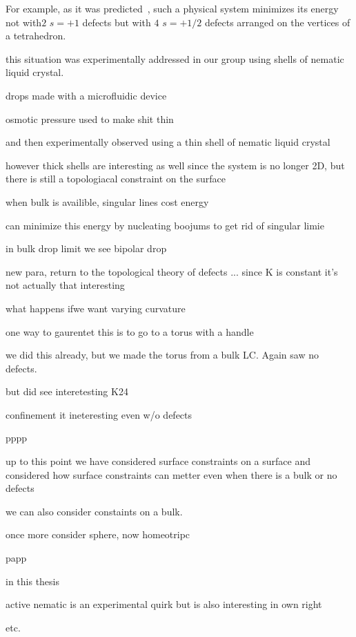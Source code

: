 For example, as it was predicted~\cite{RN42,RN104,RN43}, such a physical system minimizes its energy not with$2$ $s=+1$ defects but with $4$ $s=+1/2$ defects arranged on the vertices of a tetrahedron.

this situation was experimentally addressed in our group using shells of nematic liquid crystal.

drops made with a microfluidic device

osmotic pressure used to make shit thin

 and then experimentally observed using a thin shell of nematic liquid crystal~\cite{RN105}

however thick shells are interesting as well since the system is no longer 2D, but there is still a topologiacal constraint on the surface

when bulk is availible, singular lines cost energy


can minimize this energy by nucleating boojums to get rid of singular limie

in bulk drop limit we see bipolar drop

new para, return to the topological  theory of defects ... since K is constant it's not actually that interesting

what happens ifwe want varying curvature

one way to gaurentet this is to go to a torus with a handle

we did this already, but we made the torus from a bulk LC.  Again saw no defects.

but did see interetesting K24

confinement it ineteresting even w/o defects

pppp

up to this point we have considered surface constraints on a surface and considered how surface constraints can metter even when there is a bulk or no defects


we can also consider constaints on a bulk.

once more consider sphere, now homeotripc

papp

in this thesis


active nematic is an experimental quirk but is also interesting in own right

etc.





